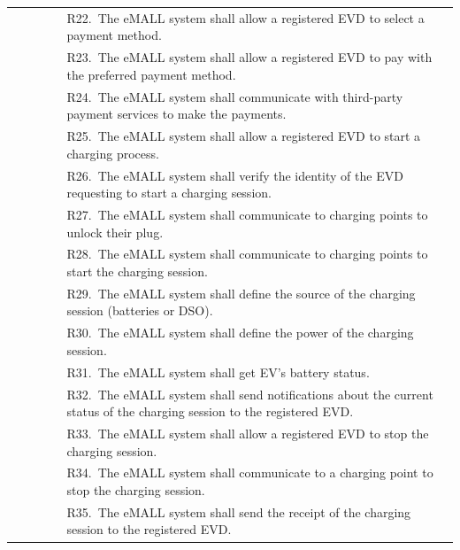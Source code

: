 \begin{center}
\begin{longtable}{p{0.12\linewidth}p{0.88\linewidth}}
        & R22.\ The eMALL system shall allow a registered EVD to select a payment method.                                                                 \\
        & R23.\ The eMALL system shall allow a registered EVD to pay with the preferred payment method.                                                   \\
        & R24.\ The eMALL system shall communicate with third-party payment services to make the payments.                                                \\
        & R25.\ The eMALL system shall allow a registered EVD to start a charging process.                                                                \\
        & R26.\ The eMALL system shall verify the identity of the EVD requesting to start a charging session.                                             \\
        & R27.\ The eMALL system shall communicate to charging points to unlock their plug.                                                               \\
        & R28.\ The eMALL system shall communicate to charging points to start the charging session.                                                      \\
        & R29.\ The eMALL system shall define the source of the charging session (batteries or DSO).                                                      \\
        & R30.\ The eMALL system shall define the power of the charging session.                                                                          \\
        & R31.\ The eMALL system shall get EV’s battery status.                                                                                           \\
        & R32.\ The eMALL system shall send notifications about the current status of the charging session to the registered EVD\@.                       \\
        & R33.\ The eMALL system shall allow a registered EVD to stop the charging session.                                                               \\
        & R34.\ The eMALL system shall communicate to a charging point to stop the charging session.                                                      \\
        & R35.\ The eMALL system shall send the receipt of the charging session to the registered EVD\@.                                                  \\

\end{longtable}
\end{center}
